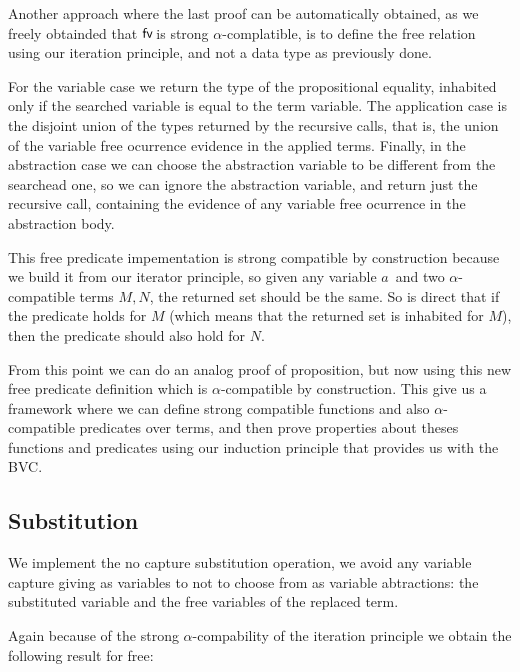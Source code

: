 \documentclass{entcs}
\newcommand{\alp}{\ensuremath{\alpha}}
\newcommand{\fv}{\ensuremath{{\AgdaFunction{fv}}\,}}
\begin{document}
Another approach where the last proof can be automatically obtained, as we freely obtainded that \fv is strong \alp-complatible, is to define the free relation using our iteration principle, and not a data type as previously done.

 \hspace{5px}

For the variable case we return the type of the propositional equality, inhabited only if the searched variable is equal to the term variable. The application case is the disjoint union of the types returned by the recursive calls, that is, the union of the variable free ocurrence evidence in the applied terms. Finally, in the abstraction case we can choose the abstraction variable to be different from the searchead one, so we can ignore the abstraction variable, and return just the recursive call, containing the evidence of any variable free ocurrence in the abstraction body. 

This free predicate impementation is strong compatible by construction because we build it from our iterator principle, so given any variable $a$\ and two \alp-compatible terms $M,N$, the returned set should be the same. So is direct that if the predicate holds for $M$ (which means that the returned set is inhabited for $M$), then the predicate should also hold for $N$. 

From this point we can  do an analog proof of  proposition, but now using this new free predicate definition which is \alp-compatible by construction. This give us a framework where we can define strong compatible functions and also \alp-compatible predicates over terms, and then prove properties about theses functions and predicates using our induction principle that provides us with the BVC.

\subsection{Substitution}
\label{subst}

We implement the no capture substitution operation, we avoid any variable capture giving as variables to not to choose from as variable abtractions: the substituted variable and the free variables of the replaced term.

 \hspace{5px}

Again because of the strong \alp-compability of the iteration principle we obtain the following result for free:
\end{document}
